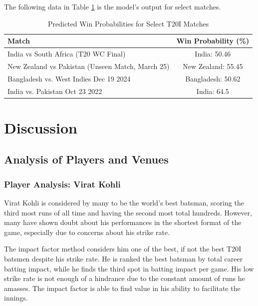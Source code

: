 \documentclass{article}[12pt]
\begin{document}
The following data in Table \ref{tab:select} is the model's output for select matches.
\begin{table}[h!]
\centering
\caption{Predicted Win Probabilities for Select T20I Matches}
\begin{tabular}{|l|c|}
\hline
\textbf{Match} & \textbf{Win Probability (\%)} \\
\hline
India vs South Africa (T20 WC Final) & India: 50.46 \\
New Zealand vs Pakistan (Unseen Match, March 25) & New Zealand: 55.45 \\
Bangladesh vs. West Indies Dec 19 2024 & Bangladesh: 50.62 \\
India vs. Pakistan Oct 23 2022 & India: 64.5 \\
\hline
\end{tabular}
\label{tab:select}
\end{table}



\section{Discussion}

\subsection{Analysis of Players and Venues}



\subsubsection{Player Analysis: Virat Kohli}

Virat Kohli is considered by many to be the world's best batsman, scoring the third most runs of all time and having the second most total hundreds. \parencite{espn_2025_espncricinfo2} However, many have shown doubt about his performances in the shortest format of the game, especially due to concerns about his strike rate. \parencite{toisportsdesk_2024_usually}

The impact factor method considers him one of the best, if not the best T20I batsmen despite his strike rate. He is ranked the best batsman by total career batting impact, while he finds the third spot in batting impact per game. His low strike rate is not enough of a hindrance due to the constant amount of runs he amasses. The impact factor is able to find value in his ability to facilitate the innings.
\end{document}
